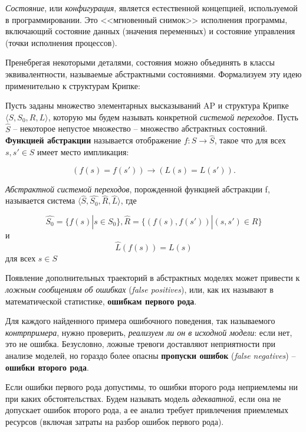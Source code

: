 \textit{Состояние}, или \textit{конфигурация}, является естественной концепцией, используемой в программировании. 
Это <<мгновенный снимок>> исполнения программы, включающий состояние данных (значения переменных) и состояние управления (точки исполнения процессов).

Пренебрегая некоторыми деталями, состояния можно объединять в классы эквивалентности, называемые абстрактными состояниями. 
Формализуем эту идею применительно к структурам Крипке:

Пусть заданы множество элементарных высказываний AP и структура Крипке $\langle S, S_0, R, L \rangle$, которую мы будем называть конкретной \textit{системой переходов}. 
Пусть $\hat{S}$  -- некоторое непустое множество -- множество абстрактных состояний. 
\textbf{Функцией абстракции} называется отображение $f: S \rightarrow \hat{S}$, такое что для всех $s, s' \in S$ имеет место импликация:

\begin{equation}
	(f(s) = f(s')) \rightarrow (L(s) = L(s')).
\end{equation}

\textit{Абстрактной системой переходов}, порожденной функцией абстракции f, называется система $\langle  \hat{S},  \hat{S_0},  \hat{R},  \hat{L} \rangle$, где

\begin{displaymath}
  \hat{S_0} = \{f(s) | s \in S_0\}, \hat{R} = \{ (f(s), f(s')) | (s, s') \in R \}
\end{displaymath}
  и
\begin{displaymath}
  \hat{L} (f(s)) = L(s) 
\end{displaymath}
для всех $s \in S$

\indent
\newline
Появление дополнительных траекторий в абстрактных моделях может привести к \textit{ложным сообщениям об ошибках} (\textit{false positives}), или, как их называют в математической статистике, \textbf{ошибкам первого рода}.

Для каждого найденного примера ошибочного поведения, так называемого \textit{контрпримера}, нужно проверить, \textit{реализуем ли он в исходной модели}: если нет, это не ошибка. 
Безусловно, ложные тревоги доставляют неприятности при анализе моделей, но гораздо более опасны \textbf{пропуски ошибок} (\textit{false negatives}) -- \textbf{ошибки второго рода}.

Если ошибки первого рода допустимы, то ошибки второго рода неприемлемы ни при каких обстоятельствах. 
Будем называть модель \textit{адекватной}, если она не допускает ошибок второго рода, а ее анализ требует привлечения приемлемых ресурсов (включая затраты на разбор ошибок первого рода).


